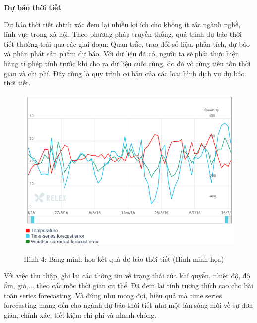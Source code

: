 \vspace{1cm}
\changefontsizes{15pt}
\setlength{\parindent}{0cm}
\textbf{Dự báo thời tiết}

\vspace{0.5cm}
\changefontsizes{13pt}
\setlength{\parindent}{0cm}

Dự báo thời tiết chính xác đem lại nhiều lợi ích cho không ít các ngành nghề, lĩnh vực trong xã hội. Theo phương pháp truyền thống, quá trình dự báo thời tiết thường trải qua các giai đoạn:  Quan trắc, trao đổi số liệu, phân tích, dự báo và phân phát sản phẩm dự báo. Với dữ liệu đã có, người ta sẽ phải thực hiện hàng tỉ phép tính trước khi cho ra dữ liệu cuối cùng, do đó vô cùng tiêu tốn thời gian và chi phí. Đây cũng là quy trình cơ bản của các loại hình dịch vụ dự báo thời tiết.



\begin{center}
	\begin{figure}[htp]
		\begin{center}
			\includegraphics[scale=0.8]{./images/pre.png}
		\end{center}
		\label{fig1}{Hình 4: Bảng minh họa kết quả dự báo thời tiết (Hình minh họa)}
	\end{figure}
\end{center}


Với việc thu thập, ghi lại các thông tin về trạng thái của khí quyển, nhiệt độ, độ ẩm, gió,... theo các mốc thời gian cụ thể. Đã đem lại tính tương thích cao cho bài toán series forecasting. Và đúng như mong đợi, hiệu quả mà time series forecasting mang đến cho ngành dự báo thời tiết như một làn sóng mới về sự đơn giản, chính xác, tiết kiệm chi phí và nhanh chóng. 




